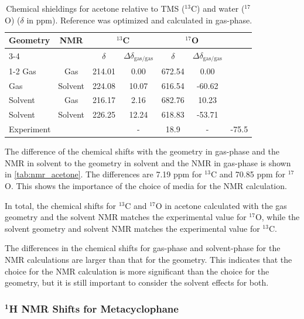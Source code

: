 \documentclass[fontsize=11pt,a4paper,oneside]{scrartcl}
\begin{document}
\begin{table}[htbp]
    \centering
    \caption{Chemical shieldings for acetone relative to \ac{TMS} ($^{13}$C) and water ($^{17}$O) ($\delta$ in ppm). Reference was optimized and calculated in gas-phase.}
        \begin{tabular}{@{}lcccccc@{}} \toprule
        \multirow{2}{*}{Geometry} & \multirow{2}{*}{NMR} & \multicolumn{2}{c}{$^{13}$C} & \multicolumn{2}{c}{$^{17}$O} \\
        \cmidrule{3-4} \cmidrule{5-6}
        & & $\delta$ & $\Delta\delta_{\text{gas/gas}}$ & $\delta$ & $\Delta\delta_{\text{gas/gas}}$ \\
        \cmidrule{1-2} \cmidrule{3-4} \cmidrule{5-6}
        Gas & Gas & 214.01 & 0.00 & 672.54 & 0.00 \\
        Gas & Solvent & 224.08 & 10.07 & 616.54 & -60.62 \\
        Solvent & Gas & 216.17 & 2.16 & 682.76 & 10.23 \\
        Solvent & Solvent & 226.25 & 12.24 & 618.83 & -53.71 \\ \midrule
        \multicolumn{2}{l}{Experiment\autocite{AKGrimme2025}} & & - & 18.9 & - & -75.5 \\
        \bottomrule
        \end{tabular}
    \label{tab:nmr_acetone}
\end{table}

The difference of the chemical shifts with the geometry in gas-phase and the NMR in solvent to the geometry in solvent and the NMR in gas-phase is shown in \autoref{tab:nmr_acetone}. The differences are 7.19 ppm for $^{13}$C and 70.85 ppm for $^{17}$O. This shows the importance of the choice of media for the NMR calculation.

In total, the chemical shifts for $^{13}$C and $^{17}$O in acetone calculated with the gas geometry and the solvent NMR matches the experimental value for $^{17}$O, while the solvent geometry and solvent NMR matches the experimental value for $^{13}$C.

The differences in the chemical shifts for gas-phase and solvent-phase for the NMR calculations are larger than that for the geometry. This indicates that the choice for the NMR calculation is more significant than the choice for the geometry, but it is still important to consider the solvent effects for both.


\clearpage
\subsubsection*{$^\mathbf{1}$H NMR Shifts for Metacyclophane}
\end{document}
